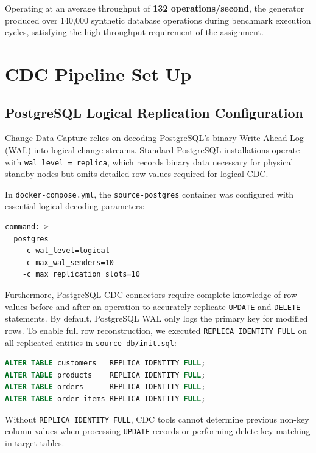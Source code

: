 \documentclass[peerreviewca]{IEEEtran}
\begin{document}
Operating at an average throughput of \textbf{132 operations/second}, the generator produced over 140,000 synthetic database operations during benchmark execution cycles, satisfying the high-throughput requirement of the assignment.

\section{CDC Pipeline Set Up}
\label{sec:cdc}

\subsection{PostgreSQL Logical Replication Configuration}
Change Data Capture relies on decoding PostgreSQL's binary Write-Ahead Log (WAL) into logical change streams. Standard PostgreSQL installations operate with \texttt{wal\_level = replica}, which records binary data necessary for physical standby nodes but omits detailed row values required for logical CDC.

In \texttt{docker-compose.yml}, the \texttt{source-postgres} container was configured with essential logical decoding parameters:
\begin{lstlisting}[language=bash, caption={PostgreSQL startup flags for logical decoding.}]
command: >
  postgres
    -c wal_level=logical
    -c max_wal_senders=10
    -c max_replication_slots=10
\end{lstlisting}

Furthermore, PostgreSQL CDC connectors require complete knowledge of row values before and after an operation to accurately replicate \texttt{UPDATE} and \texttt{DELETE} statements. By default, PostgreSQL WAL only logs the primary key for modified rows. To enable full row reconstruction, we executed \texttt{REPLICA IDENTITY FULL} on all replicated entities in \texttt{source-db/init.sql}:
\begin{lstlisting}[language=SQL, caption={Enabling full replica identity across transactional tables.}]
ALTER TABLE customers   REPLICA IDENTITY FULL;
ALTER TABLE products    REPLICA IDENTITY FULL;
ALTER TABLE orders      REPLICA IDENTITY FULL;
ALTER TABLE order_items REPLICA IDENTITY FULL;
\end{lstlisting}

Without \texttt{REPLICA IDENTITY FULL}, CDC tools cannot determine previous non-key column values when processing \texttt{UPDATE} records or performing delete key matching in target tables.
\end{document}
